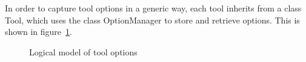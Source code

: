 \documentclass[a4paper,fleqn]{article}
\begin{document}
In order to capture tool options in a generic way, each tool inherits from a
class Tool, which uses the class OptionManager to store and retrieve options.
This is shown in figure~\ref{fig:logic:tools:options}.

\begin{figure}[hbtp]
\caption{Logical model of tool options}\label{fig:logic:tools:options}
\end{figure}
\end{document}
